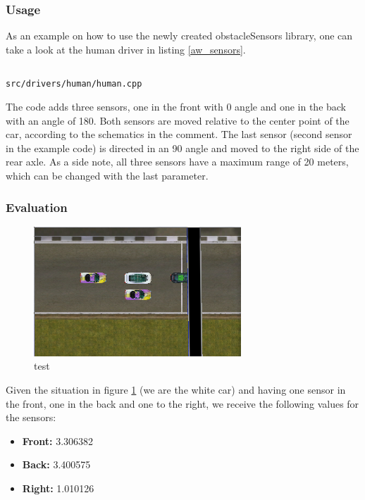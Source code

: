 \documentclass[paper=a4, fontsize=11pt]{scrreprt}
\begin{document}
\subsubsection{Usage}
As an example on how to use the newly created obstacleSensors library,
one can take a look at the human driver in listing \ref{aw_sensors}.

\begin{listing}[ht]\label{aw_sensors}
  \inputminted[firstline=245,linenos=true,lastline=256,gobble=4]{c++}{../../../simulators/speed-dreams/src/drivers/human/human.cpp}
  \caption{\texttt{src/drivers/human/human.cpp}}
\end{listing}

The code adds three sensors, one in the front with 0\degree{} angle
and one in the back with an angle of 180\degree{}.
Both sensors are moved relative to the center point of the car,
according to the schematics in the comment.
The last sensor (second sensor in the example code) is directed in an 90\degree{} angle
and moved to the right side of the rear axle.
As a side note, all three sensors have a maximum range of 20 meters,
which can be changed with the last parameter.

\subsubsection{Evaluation}
\begin{figure}
  \begin{center}
  \includegraphics[scale=0.5]{aw_imgs/parked.png}
\end{center}
\caption{test}\label{aw_parked_img}
\end{figure}

Given the situation in figure \ref{aw_parked_img}
(we are the white car) and having one sensor in the front,
one in the back and one to the right,
we receive the following values for the sensors:
\begin{itemize}
  \item \textbf{Front:} 3.306382
  \item \textbf{Back:} 3.400575
  \item \textbf{Right:} 1.010126
\end{itemize}
\end{document}
